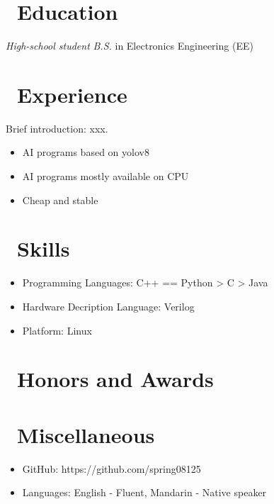 \documentclass{resume}
\begin{document}



\section{\faGraduationCap\ Education}
\textit{High-school student} 
\textit{B.S.} in Electronics Engineering (EE)

\section{\faUsers\ Experience}
Brief introduction: xxx.
\begin{itemize}
  \item AI programs based on yolov8
  \item AI programs mostly available on CPU
  \item Cheap and stable
\end{itemize}




\section{\faCogs\ Skills}
\begin{itemize}[parsep=0.5ex]
  \item Programming Languages: C++ == Python > C > Java
  \item Hardware Decription Language: Verilog
  \item Platform: Linux
\end{itemize}

\section{\faHeartO\ Honors and Awards}
\datedline{Other awards}{2023}

\section{\faInfo\ Miscellaneous}
\begin{itemize}[parsep=0.5ex]
  \item GitHub: https://github.com/spring08125
  \item Languages: English - Fluent, Mandarin - Native speaker
\end{itemize}

%
%
\end{document}
